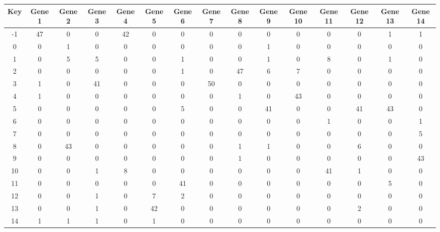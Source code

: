 \begin{tabular}{|c|c|c|c|c|c|c|c|c|c|c|c|c|c|c|}
\hline
Key & Gene 1 & Gene 2 & Gene 3 & Gene 4 & Gene 5 & Gene 6 & Gene 7 & Gene 8 & Gene 9 & Gene 10 & Gene 11 & Gene 12 & Gene 13 & Gene 14 \\
\hline
-1 & 47 & 0 & 0 & 42 & 0 & 0 & 0 & 0 & 0 & 0 & 0 & 0 & 1 & 1 \\
0 & 0 & 1 & 0 & 0 & 0 & 0 & 0 & 0 & 1 & 0 & 0 & 0 & 0 & 0 \\
1 & 0 & 5 & 5 & 0 & 0 & 1 & 0 & 0 & 1 & 0 & 8 & 0 & 1 & 0 \\
2 & 0 & 0 & 0 & 0 & 0 & 1 & 0 & 47 & 6 & 7 & 0 & 0 & 0 & 0 \\
3 & 1 & 0 & 41 & 0 & 0 & 0 & 50 & 0 & 0 & 0 & 0 & 0 & 0 & 0 \\
4 & 1 & 0 & 0 & 0 & 0 & 0 & 0 & 1 & 0 & 43 & 0 & 0 & 0 & 0 \\
5 & 0 & 0 & 0 & 0 & 0 & 5 & 0 & 0 & 41 & 0 & 0 & 41 & 43 & 0 \\
6 & 0 & 0 & 0 & 0 & 0 & 0 & 0 & 0 & 0 & 0 & 1 & 0 & 0 & 1 \\
7 & 0 & 0 & 0 & 0 & 0 & 0 & 0 & 0 & 0 & 0 & 0 & 0 & 0 & 5 \\
8 & 0 & 43 & 0 & 0 & 0 & 0 & 0 & 1 & 1 & 0 & 0 & 6 & 0 & 0 \\
9 & 0 & 0 & 0 & 0 & 0 & 0 & 0 & 1 & 0 & 0 & 0 & 0 & 0 & 43 \\
10 & 0 & 0 & 1 & 8 & 0 & 0 & 0 & 0 & 0 & 0 & 41 & 1 & 0 & 0 \\
11 & 0 & 0 & 0 & 0 & 0 & 41 & 0 & 0 & 0 & 0 & 0 & 0 & 5 & 0 \\
12 & 0 & 0 & 1 & 0 & 7 & 2 & 0 & 0 & 0 & 0 & 0 & 0 & 0 & 0 \\
13 & 0 & 0 & 1 & 0 & 42 & 0 & 0 & 0 & 0 & 0 & 0 & 2 & 0 & 0 \\
14 & 1 & 1 & 1 & 0 & 1 & 0 & 0 & 0 & 0 & 0 & 0 & 0 & 0 & 0 \\
\hline
\end{tabular}
